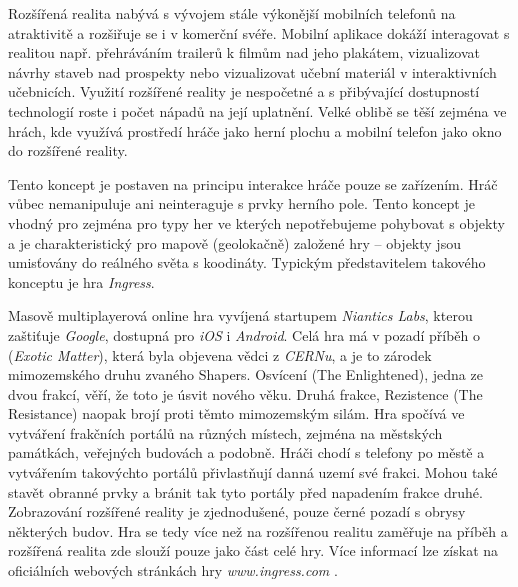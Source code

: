 \documentclass[twoside,12pt]{article}
\begin{document}
Rozšířená realita nabývá s vývojem stále výkonější mobilních telefonů na atraktivitě a rozšiřuje se i v komerční svéře. Mobilní aplikace dokáží interagovat s realitou např. přehráváním trailerů k filmům nad jeho plakátem, vizualizovat návrhy staveb nad prospekty nebo vizualizovat učební materiál v interaktivních učebnicích. Využití rozšířené reality je nespočetné a s přibývající dostupností technologií roste i počet nápadů na její uplatnění. Velké oblibě se těší zejména ve hrách, kde využívá prostředí hráče jako herní plochu a mobilní telefon jako okno do rozšířené reality.

Tento koncept je postaven na principu interakce hráče pouze se zařízením. Hráč vůbec nemanipuluje ani neinteraguje s prvky herního pole. Tento koncept je vhodný pro zejména pro typy her ve kterých nepotřebujeme pohybovat s objekty a je charakteristický pro mapově (geolokačně) založené hry -- objekty jsou umisťovány do reálného světa s koodináty. Typickým představitelem takového konceptu je hra \textit{Ingress}.

%
% 

Masově multiplayerová online hra vyvíjená startupem \textit{Niantics Labs}, kterou zaštiťuje \textit{Google}, dostupná pro \textit{iOS} i \textit{Android}. Celá hra má v pozadí příběh o  (\textit{Exotic Matter}), která byla objevena vědci z \textit{CERNu}, a je to zárodek mimozemského druhu zvaného Shapers. Osvícení (The Enlightened), jedna ze dvou frakcí, věří, že toto je úsvit nového věku. Druhá frakce, Rezistence (The Resistance) naopak brojí proti těmto mimozemským silám. Hra spočívá ve vytváření frakčních portálů na různých místech, zejména na městských památkách, veřejných budovách a podobně. Hráči chodí s telefony po městě a vytvářením takovýchto portálů přivlastňují danná uzemí své frakci. Mohou také stavět obranné prvky a bránit tak tyto portály před napadením frakce druhé. Zobrazování rozšířené reality je zjednodušené, pouze černé pozadí s obrysy některých budov. Hra se tedy více než na rozšířenou realitu zaměřuje na příběh a rozšířená realita zde slouží pouze jako část celé hry. Více informací lze získat na oficiálních webových stránkách hry \textit{www.ingress.com} \cite{ingress}.
\end{document}
